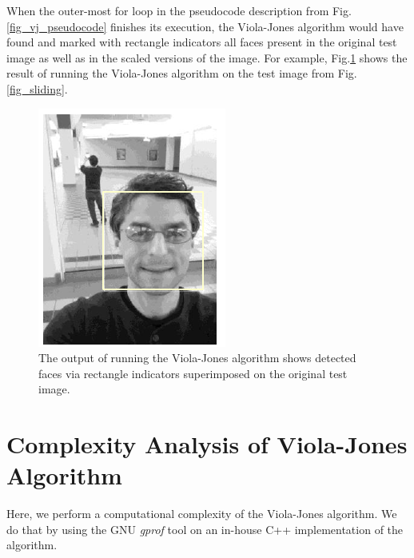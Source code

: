 \documentclass[conference]{IEEEtran}
\begin{document}
When the outer-most for loop in the pseudocode description from Fig.\ref{fig_vj_pseudocode} finishes its execution, the Viola-Jones algorithm would have found and marked with rectangle indicators all faces present in the original test image as well as in the scaled versions of the image. For example, Fig.\ref{fig_face_detection_example} shows the result of running the Viola-Jones algorithm on the test image from Fig.\ref{fig_sliding}.


\begin{figure}[!htb]
\centering
	\includegraphics[scale=1.0]{fig_face_detection_example}
\caption{The output of running the Viola-Jones algorithm shows detected faces via rectangle indicators superimposed on the original test image.}
\label{fig_face_detection_example}
\end{figure}




\section {Complexity Analysis of Viola-Jones Algorithm}


Here, we perform a computational complexity of the Viola-Jones algorithm.
We do that by using the GNU {\it gprof} tool on an in-house C++ implementation of the algorithm.



\end{document}
